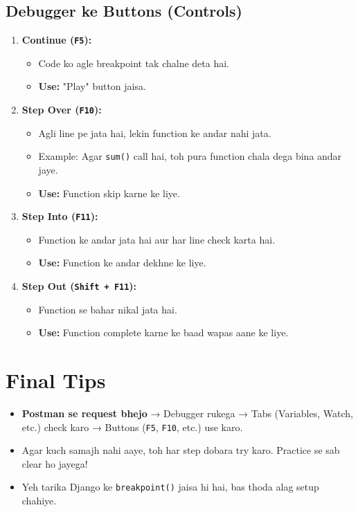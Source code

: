 \documentclass[a4paper,12pt]{article}
\begin{document}
\subsection{ Debugger ke Buttons (Controls)}
\begin{enumerate}
    \item \textbf{\color{myblue}Continue (\texttt{\color{mygreen}F5}):}  
    \begin{itemize}
        \item Code ko agle breakpoint tak chalne deta hai.
        \item \textbf{\color{myblue}Use:} "Play" button jaisa.
    \end{itemize}

    \item \textbf{\color{myblue}Step Over (\texttt{\color{mygreen}F10}):}  
    \begin{itemize}
        \item Agli line pe jata hai, lekin function ke andar nahi jata.
        \item Example: Agar \texttt{\color{mygreen}sum()} call hai, toh pura function chala dega bina andar jaye.
        \item \textbf{\color{myblue}Use:} Function skip karne ke liye.
    \end{itemize}

    \item \textbf{\color{myblue}Step Into (\texttt{\color{mygreen}F11}):}  
    \begin{itemize}
        \item Function ke andar jata hai aur har line check karta hai.
        \item \textbf{\color{myblue}Use:} Function ke andar dekhne ke liye.
    \end{itemize}

    \item \textbf{\color{myblue}Step Out (\texttt{\color{mygreen}Shift + F11}):}  
    \begin{itemize}
        \item Function se bahar nikal jata hai.
        \item \textbf{\color{myblue}Use:} Function complete karne ke baad wapas aane ke liye.
    \end{itemize}
\end{enumerate}

\section{ Final Tips}
\begin{itemize}
    \item \textbf{\color{myblue}Postman se request bhejo} → Debugger rukega → Tabs (Variables, Watch, etc.) check karo → Buttons (\texttt{\color{mygreen}F5}, \texttt{\color{mygreen}F10}, etc.) use karo.
    \item Agar kuch samajh nahi aaye, toh har step dobara try karo. Practice se sab clear ho jayega!
    \item Yeh tarika Django ke \texttt{\color{mygreen}breakpoint()} jaisa hi hai, bas thoda alag setup chahiye.
\end{itemize}
\end{document}
